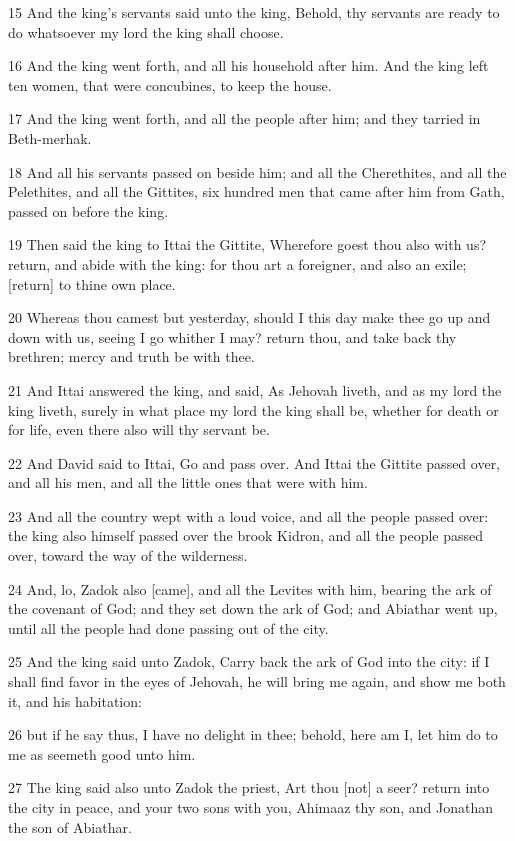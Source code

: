 \par 15 And the king's servants said unto the king, Behold, thy servants are ready to do whatsoever my lord the king shall choose.
\par 16 And the king went forth, and all his household after him. And the king left ten women, that were concubines, to keep the house.
\par 17 And the king went forth, and all the people after him; and they tarried in Beth-merhak.
\par 18 And all his servants passed on beside him; and all the Cherethites, and all the Pelethites, and all the Gittites, six hundred men that came after him from Gath, passed on before the king.
\par 19 Then said the king to Ittai the Gittite, Wherefore goest thou also with us? return, and abide with the king: for thou art a foreigner, and also an exile; [return] to thine own place.
\par 20 Whereas thou camest but yesterday, should I this day make thee go up and down with us, seeing I go whither I may? return thou, and take back thy brethren; mercy and truth be with thee.
\par 21 And Ittai answered the king, and said, As Jehovah liveth, and as my lord the king liveth, surely in what place my lord the king shall be, whether for death or for life, even there also will thy servant be.
\par 22 And David said to Ittai, Go and pass over. And Ittai the Gittite passed over, and all his men, and all the little ones that were with him.
\par 23 And all the country wept with a loud voice, and all the people passed over: the king also himself passed over the brook Kidron, and all the people passed over, toward the way of the wilderness.
\par 24 And, lo, Zadok also [came], and all the Levites with him, bearing the ark of the covenant of God; and they set down the ark of God; and Abiathar went up, until all the people had done passing out of the city.
\par 25 And the king said unto Zadok, Carry back the ark of God into the city: if I shall find favor in the eyes of Jehovah, he will bring me again, and show me both it, and his habitation:
\par 26 but if he say thus, I have no delight in thee; behold, here am I, let him do to me as seemeth good unto him.
\par 27 The king said also unto Zadok the priest, Art thou [not] a seer? return into the city in peace, and your two sons with you, Ahimaaz thy son, and Jonathan the son of Abiathar.
